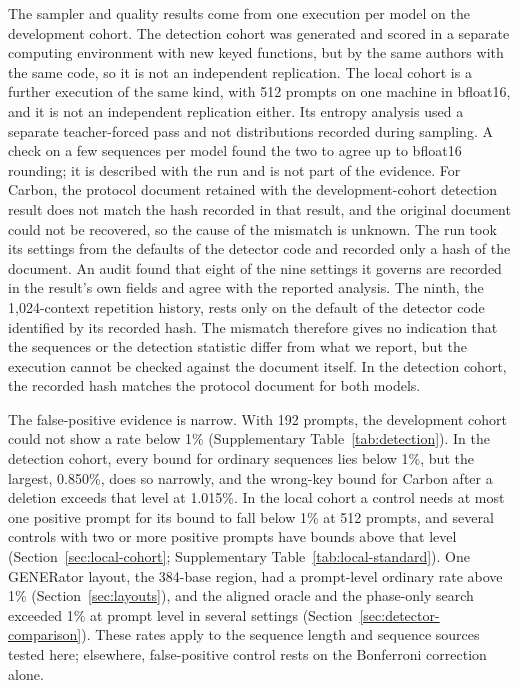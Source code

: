 \documentclass[10pt,twocolumn]{article}
\begin{document}
The sampler and quality results come from one execution per model on the development cohort. The
detection cohort was generated and scored in a separate computing environment with new keyed
functions, but by the same authors with the same code, so it is not an independent replication.
The local cohort is a further execution of the same kind, with 512 prompts on one machine in
bfloat16, and it is not an independent replication either. Its entropy analysis used a separate teacher-forced pass and not distributions recorded during
sampling. A check on a few sequences per model found the two to agree up to bfloat16 rounding; it
is described with the run and is not part of the evidence. For Carbon, the protocol document retained with the development-cohort detection result does not
match the hash recorded in that result, and the original document could not be recovered, so the
cause of the mismatch is unknown. The run took its settings from the defaults of the detector
code and recorded only a hash of the document. An audit
found that eight of the nine settings it governs are recorded in the result's own fields and agree
with the reported analysis. The ninth, the 1{,}024-context repetition history, rests only on the
default of the detector code identified by its recorded hash. The mismatch therefore gives no
indication that the sequences or the detection statistic differ from what we report, but the
execution cannot be checked against the document itself. In the detection cohort, the recorded
hash matches the protocol document for both models.

The false-positive evidence is narrow. With 192 prompts, the development cohort could not show a
rate below 1\% (Supplementary Table~\ref{tab:detection}). In the detection cohort, every bound for
ordinary sequences lies below 1\%, but the largest, 0.850\%, does so narrowly, and the wrong-key bound
for Carbon after a deletion exceeds that level at 1.015\%. In the local cohort a control needs at
most one positive prompt for its bound to fall below 1\% at 512 prompts, and several controls with
two or more positive prompts have bounds above that level (Section~\ref{sec:local-cohort}; Supplementary Table~\ref{tab:local-standard}). One GENERator
layout, the 384-base region, had a prompt-level ordinary rate above 1\%
(Section~\ref{sec:layouts}), and the aligned oracle and the phase-only search exceeded 1\% at
prompt level in several settings (Section~\ref{sec:detector-comparison}). These rates apply to the sequence length and
sequence sources tested here; elsewhere, false-positive control rests on the Bonferroni correction
alone.
\end{document}
